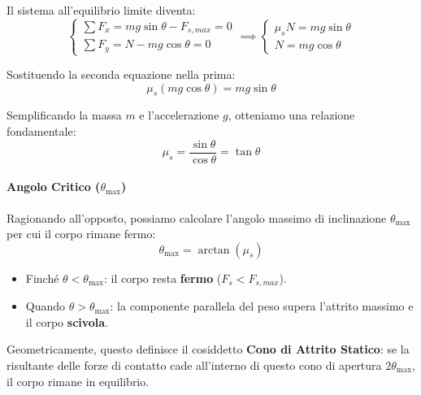 Il sistema all'equilibrio limite diventa:
\begin{equation}
\begin{cases}
    \sum F_x = m g \sin\theta - F_{s,max} = 0 \\
    \sum F_y = N - m g \cos\theta = 0
\end{cases}
\implies
\begin{cases}
    \mu_s N = m g \sin\theta \\
    N = m g \cos\theta
\end{cases}
\end{equation}

Sostituendo la seconda equazione nella prima:
\begin{equation}
    \mu_s (mg \cos\theta) = mg \sin\theta
\end{equation}

Semplificando la massa $m$ e l'accelerazione $g$, otteniamo una relazione fondamentale:
\begin{equation}
    \mu_s = \frac{\sin\theta}{\cos\theta} = \tan\theta
\end{equation}

\paragraph{Angolo Critico ($\theta_{\text{max}}$)}
Ragionando all'opposto, possiamo calcolare l'angolo massimo di inclinazione $\theta_{\text{max}}$ per cui il corpo rimane fermo:
\begin{equation}
    \theta_{\text{max}} = \arctan(\mu_s)
\end{equation}

\begin{itemize}
    \item Finché $\theta < \theta_{\text{max}}$: il corpo resta \textbf{fermo} ($F_s < F_{s,max}$).
    \item Quando $\theta > \theta_{\text{max}}$: la componente parallela del peso supera l'attrito massimo e il corpo \textbf{scivola}.
\end{itemize}

Geometricamente, questo definisce il cosiddetto \textbf{Cono di Attrito Statico}: se la risultante delle forze di contatto cade all'interno di questo cono di apertura $2\theta_{\text{max}}$, il corpo rimane in equilibrio.

